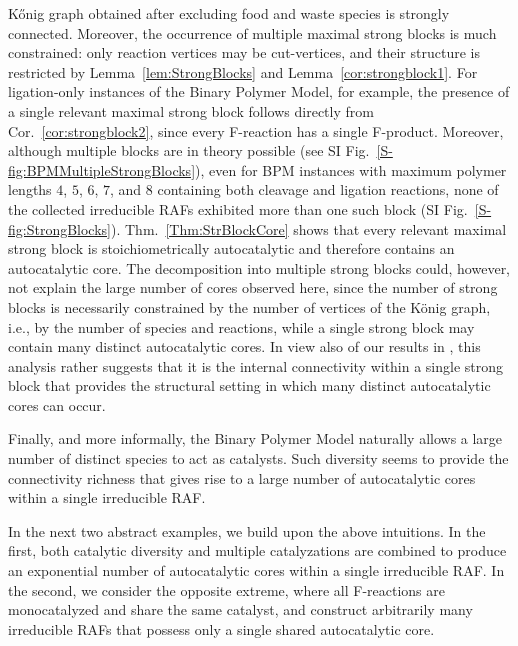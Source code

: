\documentclass[pdflatex]{sn-jnl}
\theoremstyle{thmstyleone}%
\theoremstyle{examplesty}%
\theoremstyle{thmstylethree}%
\begin{document}
\begin{itemize}
  K{\H{o}}nig graph obtained after excluding food and waste species is
  strongly connected. Moreover, the occurrence of multiple maximal strong
  blocks is much constrained: only reaction vertices may be cut-vertices,
  and their structure is restricted by Lemma~\ref{lem:StrongBlocks} and
  Lemma~\ref{cor:strongblock1}. For ligation-only instances of the Binary
  Polymer Model, for example, the presence of a single relevant maximal
  strong block follows directly from Cor.~\ref{cor:strongblock2}, since
  every F-reaction has a single F-product. Moreover, although multiple
  blocks are in theory possible (see SI
  Fig.~\ref{S-fig:BPMMultipleStrongBlocks}), even for BPM instances with
  maximum polymer lengths $4$, $5$, $6$, $7$, and $8$ containing both
  cleavage and ligation reactions, none of the collected irreducible RAFs
  exhibited more than one such block (SI
  Fig.~\ref{S-fig:StrongBlocks}). Thm.~\ref{Thm:StrBlockCore} shows that
  every relevant maximal strong block is stoichiometrically autocatalytic
  and therefore contains an autocatalytic core. The decomposition into
  multiple strong blocks could, however, not explain the large number of
  cores observed here, since the number of strong blocks is necessarily
  constrained by the number of vertices of the K\"onig graph, i.e., by the
  number of species and reactions, while a single strong block may contain
  many distinct autocatalytic cores. In view also of our results in
  \cite{golnik_enumeration_2026,golnik_bridging_2026}, this analysis rather
  suggests that it is the internal connectivity within a single strong
  block that provides the structural setting in which many distinct
  autocatalytic cores can occur.
\end{itemize}
Finally, and more informally, the Binary Polymer Model naturally allows a
large number of distinct species to act as catalysts. Such diversity seems
to provide the connectivity richness that gives rise to a large number of
autocatalytic cores within a single irreducible RAF.

In the next two abstract examples, we build upon the above intuitions. In the
first, both catalytic diversity and multiple catalyzations are combined to
produce an exponential number of autocatalytic cores within a single
irreducible RAF. In the second, we consider the opposite extreme, where all
F-reactions are monocatalyzed and share the same catalyst, and construct
arbitrarily many irreducible RAFs that possess only a single shared
autocatalytic core.
\end{document}
